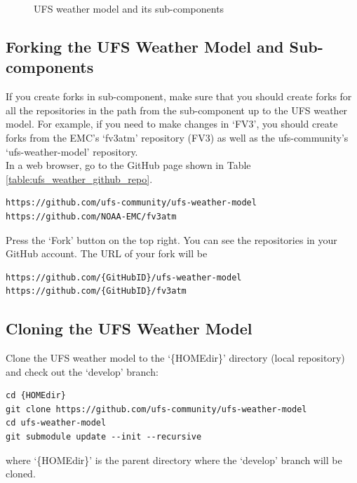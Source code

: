 \documentclass[11pt,fleqn]{report}              %
\begin{document}
\begin{figure}[ht!]
\centering
\begin{minipage}{0.5\linewidth}
\end{minipage}
\caption{UFS weather model and its sub-components}
\label{figure:ufs_weather_model_dir}
\end{figure}


\subsection{Forking the UFS Weather Model and Sub-components}

If you create forks in sub-component, make sure that you should create forks for all the repositories in the path from the sub-component up to the UFS weather model. For example, if you need to make changes in `FV3', you should create forks from the EMC's `fv3atm' repository (FV3) as well as the ufs-community's `ufs-weather-model' repository. \\

In a web browser, go to the GitHub page shown in Table \ref{table:ufs_weather_github_repo}.
\lstset{language=bash}   
\begin{lstlisting}[frame=trBL]
https://github.com/ufs-community/ufs-weather-model
https://github.com/NOAA-EMC/fv3atm
\end{lstlisting}

Press the `Fork' button on the top right. You can see the repositories in your GitHub account. The URL of your fork will be
\lstset{language=bash}   
\begin{lstlisting}[frame=trBL]
https://github.com/{GitHubID}/ufs-weather-model
https://github.com/{GitHubID}/fv3atm
\end{lstlisting}



\subsection{Cloning the UFS Weather Model}

Clone the UFS weather model to the `\{HOMEdir\}' directory (local repository) and check out the `develop' branch:
\lstset{language=bash}   
\begin{lstlisting}[frame=trBL]
cd {HOMEdir}
git clone https://github.com/ufs-community/ufs-weather-model 
cd ufs-weather-model
git submodule update --init --recursive
\end{lstlisting}
where `\{HOMEdir\}' is the parent directory where the `develop' branch will be cloned. 
\end{document}
